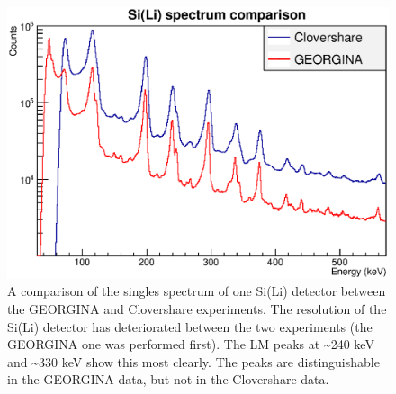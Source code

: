 \begin{figure}
    \centering
    \includegraphics[scale=0.6]{Future_Figs/ResolutionComparison.eps}
    \caption{A comparison of the singles spectrum of one Si(Li) detector between the GEORGINA and Clovershare experiments. The resolution of the Si(Li) detector has deteriorated between the two experiments (the GEORGINA one was performed first). The LM peaks at \~{}240 keV and \~{}330 keV show this most clearly. The peaks are distinguishable in the GEORGINA data, but not in the Clovershare data.}
    \label{fig:bad_sili}
\end{figure}
